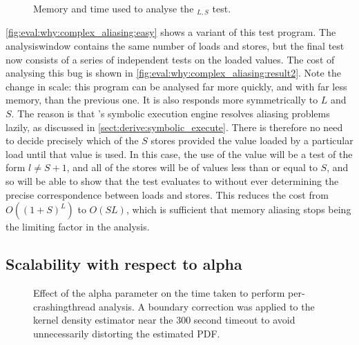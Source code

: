 \begin{figure}
  \caption{Memory and time used to analyse the
    $_{L,S}$ test.}
  \label{fig:eval:why:complex_aliasing:result2}
\end{figure}

\autoref{fig:eval:why:complex_aliasing:easy} shows a variant of this
test program.  The \gls{analysiswindow} contains the same number of
loads and stores, but the final test now consists of a series of
independent tests on the loaded values.  The cost of analysing this
bug is shown in \autoref{fig:eval:why:complex_aliasing:result2}.  Note
the change in scale: this program can be analysed far more quickly,
and with far less memory, than the previous one.  It is also responds
more symmetrically to $L$ and $S$.  The reason is that {\technique}'s
symbolic execution engine resolves aliasing problems lazily, as
discussed in \autoref{sect:derive:symbolic_execute}.  There is
therefore no need to decide precisely which of the $S$ stores provided
the value loaded by a particular load until that value is
used.  In this case, the use of the value will be a
test of the form $l \not= S+1$, and all of the stores will be of
values less than or equal to $S$, and so {\technique} will be able to
show that the test evaluates to {\true} without ever determining the
precise correspondence between loads and stores.  This reduces the
cost from $O((1+S)^L)$ to $O(SL)$, which is sufficient that memory
aliasing stops being the limiting factor in the analysis.


\subsection{Scalability with respect to \gls{alpha}}


\begin{figure}
  \caption{Effect of the \gls{alpha} parameter on the time taken to
    perform per-\gls{crashingthread} analysis.  A boundary correction
    was applied to the kernel density estimator near the 300 second
    timeout to avoid unnecessarily distorting the estimated PDF.}
  \label{fig:perf:alpha:bpm:unopt}
\end{figure}

